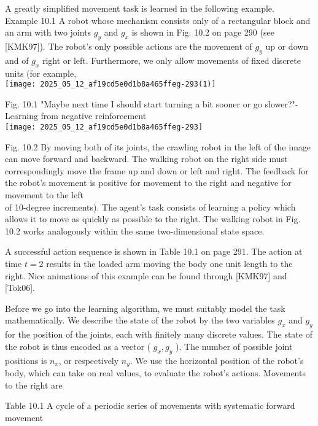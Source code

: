 \documentclass[10pt]{article}
\begin{document}
A greatly simplified movement task is learned in the following example.\\
Example 10.1 A robot whose mechanism consists only of a rectangular block and an arm with two joints $g_{y}$ and $g_{x}$ is shown in Fig. 10.2 on page 290 (see [KMK97]). The robot's only possible actions are the movement of $g_{y}$ up or down and of $g_{x}$ right or left. Furthermore, we only allow movements of fixed discrete units (for example,\\
\texttt{[image: 2025\_05\_12\_af19cd5e0d1b8a465ffeg-293(1)]}

Fig. 10.1 "Maybe next time I should start turning a bit sooner or go slower?"-Learning from negative reinforcement\\
\texttt{[image: 2025\_05\_12\_af19cd5e0d1b8a465ffeg-293]}

Fig. 10.2 By moving both of its joints, the crawling robot in the left of the image can move forward and backward. The walking robot on the right side must correspondingly move the frame up and down or left and right. The feedback for the robot's movement is positive for movement to the right and negative for movement to the left\\
of 10-degree increments). The agent's task consists of learning a policy which allows it to move as quickly as possible to the right. The walking robot in Fig. 10.2 works analogously within the same two-dimensional state space.

A successful action sequence is shown in Table 10.1 on page 291. The action at time $t=2$ results in the loaded arm moving the body one unit length to the right. Nice animations of this example can be found through [KMK97] and [Tok06].

Before we go into the learning algorithm, we must suitably model the task mathematically. We describe the state of the robot by the two variables $g_{x}$ and $g_{y}$ for the position of the joints, each with finitely many discrete values. The state of the robot is thus encoded as a vector ( $g_{x}, g_{y}$ ). The number of possible joint positions is $n_{x}$, or respectively $n_{y}$. We use the horizontal position of the robot's body, which can take on real values, to evaluate the robot's actions. Movements to the right are

Table 10.1 A cycle of a periodic series of movements with systematic forward movement
\end{document}
